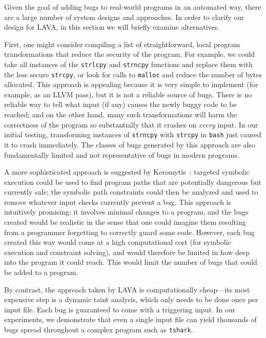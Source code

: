 Given the goal of adding bugs to real-world programs in an automated way, there are a large number of system designs and approaches.
In order to clarify our design for LAVA, in this section we will briefly examine alternatives.

First, one might consider compiling a list of straightforward, local program transformations that reduce the security of the program. 
For example, we could take all instances of the \texttt{strlcpy} and \texttt{strncpy} functions and replace them with the less secure \texttt{strcpy}, or look for calls to \texttt{malloc} and reduce the number of bytes allocated.
This approach is appealing because it is very simple to implement (for example, as an LLVM pass), but it is not a reliable source of bugs. 
There is no reliable way to tell what input (if any) causes the newly buggy code to be reached; and on the other hand, many such transformations will harm the correctness of the program so substantially that it crashes on \emph{every} input.
In our initial testing, transforming instances of \texttt{strncpy} with \texttt{strcpy} in \texttt{bash} just caused it to crash immediately.
The classes of bugs generated by this approach are also fundamentally limited and not representative of bugs in modern programs.

A more sophisticated approach is suggested by Keromytis~\cite{Keromytis:2015}: targeted symbolic execution could be used to find program paths that are potentially dangerous but currently safe; the symbolic path constraints could then be analyzed and used to remove whatever input checks currently prevent a bug. 
This approach is intuitively promising: it involves minimal changes to a program, and the bugs created would be realistic in the sense that one could imagine them resulting from a programmer forgetting to correctly guard some code. 
However, each bug created this way would come at a high computational cost (for symbolic execution and constraint solving), and would therefore be limited in how deep into the program it could reach. 
This would limit the number of bugs that could be added to a program.

By contrast, the approach taken by LAVA is computationally cheap---its most expensive step is a dynamic taint analysis, which only needs to be done once per input file. 
Each bug is guaranteed to come with a triggering input. 
In our experiments, we demonstrate that even a single input file can yield thousands of bugs spread throughout a complex program such as \texttt{tshark}.
